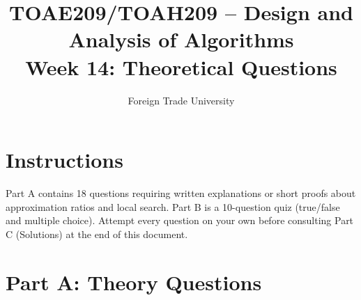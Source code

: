 \documentclass[11pt]{article}
\title{TOAE209/TOAH209 -- Design and Analysis of Algorithms\\[4pt]
\large Week 14: Theoretical Questions}
\author{Foreign Trade University}
\date{}
\begin{document}
\maketitle

\section*{Instructions}

Part A contains 18 questions requiring written explanations or short proofs about
approximation ratios and local search. Part B is a 10-question quiz (true/false and
multiple choice). Attempt every question on your own before consulting Part C (Solutions)
at the end of this document.

\section*{Part A: Theory Questions}
\end{document}
